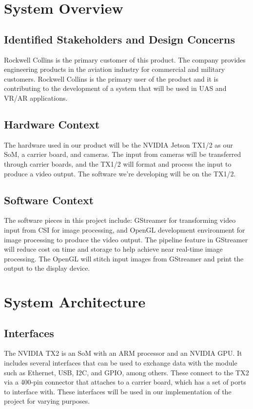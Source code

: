 \documentclass[letterpaper,10pt,serif,draftclsnofoot,onecolumn,compsoc,titlepage]{IEEEtran}
\begin{document}
\newpage
\section{System Overview}  

\subsection{Identified Stakeholders and Design Concerns}

Rockwell Collins is the primary customer of this product. The company provides 
engineering products in the aviation industry for commercial and military customers. 
Rockwell Collins is the primary user of the product and it is contributing 
to the development of a system that will be used in UAS and VR/AR applications. \\

\subsection{Hardware Context}

The hardware used in our product will be the NVIDIA Jetson TX1/2 as our SoM, 
a carrier board, and cameras. The input from cameras will be transferred through 
carrier boards, and the TX1/2 will format and process the input to produce a 
video output. The software we're developing will be on the TX1/2. \\

\subsection{Software Context}

The software pieces in this project include: GStreamer for transforming video input 
from CSI for image processing, and OpenGL development environment for image processing 
to produce the video output. The pipeline feature in GStreamer will reduce 
cost on time and storage to help achieve near real-time image processing. The OpenGL 
will stitch input images from GStreamer and print the output to the display device. \\

\section{System Architecture}

\subsection{Interfaces}
The NVIDIA TX2 is an SoM with an ARM processor and an NVIDIA GPU. It includes several interfaces that can be used to exchange data with the module such as Ethernet, USB, I2C, and GPIO, among others. These connect to the TX2 via a 400-pin connector that attaches to a carrier board, which has a set of ports to interface with. These interfaces will be used in our implementation of the project for varying purposes.
\end{document}

